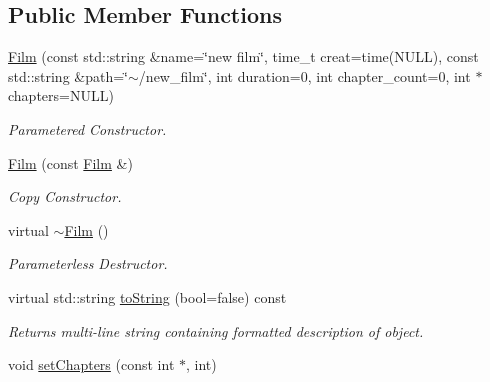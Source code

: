 \subsection*{Public Member Functions}
\begin{DoxyCompactItemize}
\item 
\hypertarget{classFilm_a704092a2bb7629c5bf053c8011e148ee}{\hyperlink{classFilm_a704092a2bb7629c5bf053c8011e148ee}{Film} (const std\-::string \&name=\char`\"{}new film\char`\"{}, time\-\_\-t creat=time(N\-U\-L\-L), const std\-::string \&path=\char`\"{}$\sim$/new\-\_\-film\char`\"{}, int duration=0, int chapter\-\_\-count=0, int $\ast$chapters=N\-U\-L\-L)}\label{classFilm_a704092a2bb7629c5bf053c8011e148ee}

\begin{DoxyCompactList}\small\item\em Parametered Constructor. \end{DoxyCompactList}\item 
\hypertarget{classFilm_a34c9de2efb9554ce1192e4110d98806b}{\hyperlink{classFilm_a34c9de2efb9554ce1192e4110d98806b}{Film} (const \hyperlink{classFilm}{Film} \&)}\label{classFilm_a34c9de2efb9554ce1192e4110d98806b}

\begin{DoxyCompactList}\small\item\em Copy Constructor. \end{DoxyCompactList}\item 
virtual \hyperlink{classFilm_a8dab653f8a6c0635ca5ddbe0bbdd9a25}{$\sim$\-Film} ()
\begin{DoxyCompactList}\small\item\em Parameterless Destructor. \end{DoxyCompactList}\item 
\hypertarget{classFilm_a413b52608cd8103e74d3ee7ea8026e17}{virtual std\-::string \hyperlink{classFilm_a413b52608cd8103e74d3ee7ea8026e17}{to\-String} (bool=false) const }\label{classFilm_a413b52608cd8103e74d3ee7ea8026e17}

\begin{DoxyCompactList}\small\item\em Returns multi-\/line string containing formatted description of object. \end{DoxyCompactList}\item 
\hypertarget{classFilm_ab0c2831b76a6b932dfc4a6facc38870c}{void \hyperlink{classFilm_ab0c2831b76a6b932dfc4a6facc38870c}{set\-Chapters} (const int $\ast$, int)}\label{classFilm_ab0c2831b76a6b932dfc4a6facc38870c}


\end{DoxyCompactItemize}
